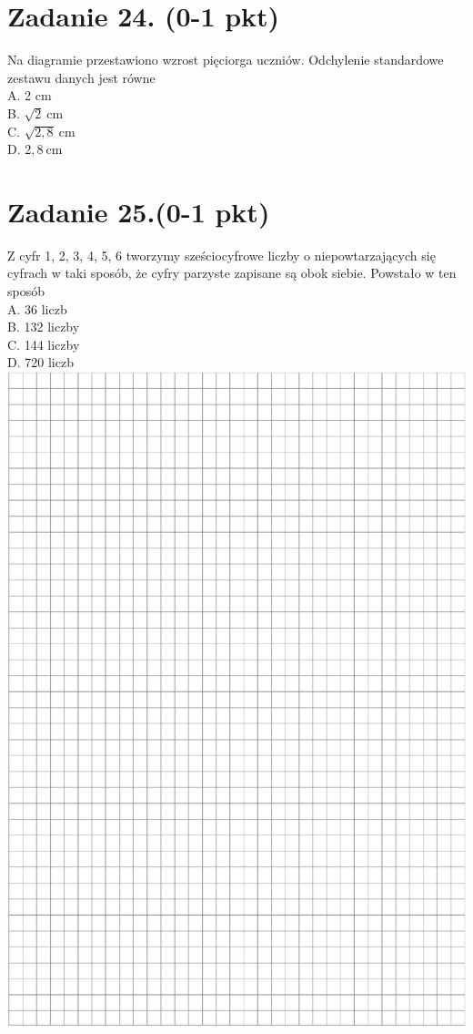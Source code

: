 \documentclass[10pt]{article}
\begin{document}
\section*{Zadanie 24. (0-1 pkt)}
Na diagramie przestawiono wzrost pięciorga uczniów. Odchylenie standardowe zestawu danych jest równe\\
A. 2 cm\\
B. \(\sqrt{2} \mathrm{~cm}\)\\
C. \(\sqrt{2,8} \mathrm{~cm}\)\\
D. \(2,8 \mathrm{~cm}\)

\section*{Zadanie 25.(0-1 pkt)}
Z cyfr 1, 2, 3, 4, 5, 6 tworzymy sześciocyfrowe liczby o niepowtarzających się cyfrach w taki sposób, że cyfry parzyste zapisane są obok siebie. Powstało w ten sposób\\
A. 36 liczb\\
B. 132 liczby\\
C. 144 liczby\\
D. 720 liczb\\
\includegraphics[max width=\textwidth, center]{2024_11_21_997c30e0b98e62837d84g-11}
\end{document}
